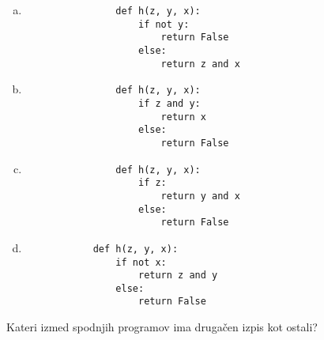 \documentclass[arhiv, 10pt]{../izpit}
\begin{document}
        \begin{multicols}{2}
        \begin{enumerate}[(a)]
\item 
                \begin{verbatim}
                def h(z, y, x):
                    if not y:
                        return False
                    else:
                        return z and x
                \end{verbatim}
            
\item 
                \begin{verbatim}
                def h(z, y, x):
                    if z and y:
                        return x
                    else:
                        return False
                \end{verbatim}
            
\item 
                \begin{verbatim}
                def h(z, y, x):
                    if z:
                        return y and x
                    else:
                        return False
                \end{verbatim}
            
\item 
            \begin{verbatim}
            def h(z, y, x):
                if not x:
                    return z and y
                else:
                    return False
            \end{verbatim}
        
\end{enumerate}

        \end{multicols}
    
        \naloga*
        
        Kateri izmed spodnjih programov ima drugačen izpis kot ostali?
    
\end{document}
